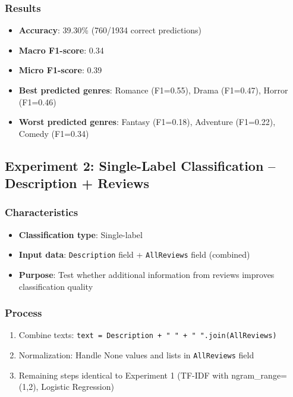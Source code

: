 \documentclass[12pt,a4paper]{article}
\begin{document}
\subsubsection{Results}
\begin{itemize}
    \item \textbf{Accuracy}: 39.30\% (760/1934 correct predictions)
    \item \textbf{Macro F1-score}: 0.34
    \item \textbf{Micro F1-score}: 0.39
    \item \textbf{Best predicted genres}: Romance (F1=0.55), Drama (F1=0.47), Horror (F1=0.46)
    \item \textbf{Worst predicted genres}: Fantasy (F1=0.18), Adventure (F1=0.22), Comedy (F1=0.34)
\end{itemize}

\subsection{Experiment 2: Single-Label Classification -- Description + Reviews}

\subsubsection{Characteristics}
\begin{itemize}
    \item \textbf{Classification type}: Single-label
    \item \textbf{Input data}: \texttt{Description} field + \texttt{AllReviews} field (combined)
    \item \textbf{Purpose}: Test whether additional information from reviews improves classification quality
\end{itemize}

\subsubsection{Process}
\begin{enumerate}
    \item Combine texts: \texttt{text = Description + " " + " ".join(AllReviews)}
    \item Normalization: Handle None values and lists in \texttt{AllReviews} field
    \item Remaining steps identical to Experiment 1 (TF-IDF with ngram\_range=(1,2), Logistic Regression)
\end{enumerate}
\end{document}

